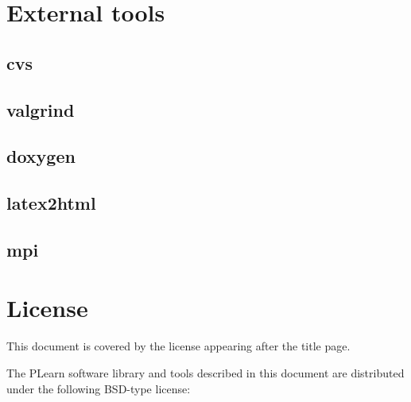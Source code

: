 \documentclass[11pt]{book}
\begin{document}

\chapter{External tools}

\section{cvs}

\section{valgrind}

\section{doxygen}

\section{latex2html}

\section{mpi}


\chapter*{License}

This document is covered by the license appearing after the title page.

\vspace*{.5cm}

The PLearn software library and tools described in this document are
distributed under the following BSD-type license:
\end{document}
